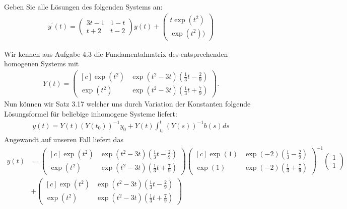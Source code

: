 \begin{exercise}
Geben Sie alle Lösungen des folgenden Systems an:
\begin{align*}
  y^{\prime}(t) = \begin{pmatrix}
    3t -1 & 1 - t \\ t + 2 & t - 2
  \end{pmatrix}
  y(t) +
  \begin{pmatrix}
    t\exp(t^2) \\ \exp(t^2))
  \end{pmatrix}
\end{align*}
\end{exercise}
\begin{solution}
Wir kennen aus Aufgabe 4.3 die Fundamentalmatrix des entsprechenden homogenen Systems mit
\begin{align*}
Y(t) = \begin{pmatrix*}[c]
  \exp(t^2) & \exp(t^2-3t)(\frac{1}{3}t - \frac{2}{9}) \\
  \exp(t^2) & \exp(t^2-3t)(\frac{1}{3}t + \frac{7}{9})
\end{pmatrix*}.
\end{align*}
Nun können wir Satz 3.17 welcher uns durch Variation der Konstanten folgende
Lösungsformel für beliebige inhomogene Systeme liefert:
\begin{align*}
  y(t) = Y(t)(Y(t_0))^{-1}y_0 + Y(t)\int_{t_0}^{t}(Y(s))^{-1}b(s)ds
\end{align*}
Angewandt auf unseren Fall liefert das
\begin{align*}
  y(t) &= \begin{pmatrix*}[c]
    \exp(t^2) & \exp(t^2-3t)(\frac{1}{3}t - \frac{2}{9}) \\
    \exp(t^2) & \exp(t^2-3t)(\frac{1}{3}t + \frac{7}{9})
  \end{pmatrix*}
  \begin{pmatrix*}[c]
    \exp(1) & \exp(-2)(\frac{1}{3} - \frac{2}{9}) \\
    \exp(1) & \exp(-2)(\frac{1}{3} + \frac{7}{9})
  \end{pmatrix*}^{-1}
  \begin{pmatrix}
    1 \\ 1
  \end{pmatrix} \\
  &+
  \begin{pmatrix*}[c]
    \exp(t^2) & \exp(t^2-3t)(\frac{1}{3}t - \frac{2}{9}) \\
    \exp(t^2) & \exp(t^2-3t)(\frac{1}{3}t + \frac{7}{9})
  \end{pmatrix*}

\end{align*}
\end{solution}
